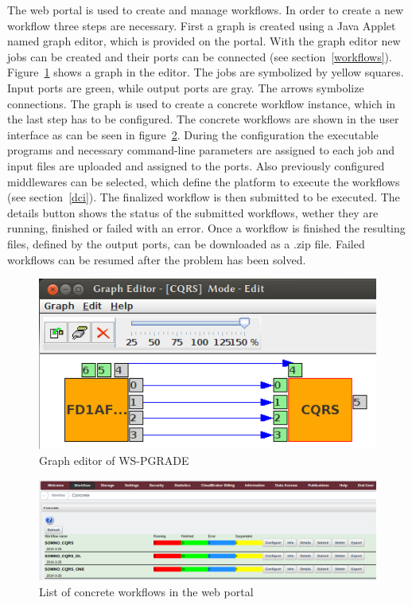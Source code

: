 The web portal is used to create and manage workflows. In order to create a new workflow three steps are necessary. First a graph is created using a Java Applet named graph editor, which is provided on the portal. With the graph editor new jobs can be created and their ports can be connected (see section~\ref{workflows}). Figure~\ref{fig:grapheditor} shows a graph in the editor. The jobs are symbolized by yellow squares. Input ports are green, while output ports are gray. The arrows symbolize connections.
The graph is used to create a concrete workflow instance, which in the last step has to be configured.
The concrete workflows are shown in the user interface as can be seen in figure~\ref{fig:interfaceworkflows}.
During the configuration the executable programs and necessary command-line parameters are assigned to each job and input files are uploaded and assigned to the ports.
Also previously configured middlewares can be selected, which define the platform to execute the workflows (see section~\ref{dci}).
The finalized workflow is then submitted to be executed.
The details button shows the status of the submitted workflows, wether they are running, finished or failed with an error.
Once a workflow is finished the resulting files, defined by the output ports, can be downloaded as a .zip file.
Failed workflows can be resumed after the problem has been solved.

\begin{figure}%
                \centering
                \includegraphics[width=1.0\columnwidth]{images/graph-editor.png}
                \caption{Graph editor of WS-PGRADE}
                \label{fig:grapheditor}
\end{figure}

\begin{figure}%
                \centering
                \includegraphics[width=2.0\columnwidth]{images/interface-workflows.png}
                \caption{List of concrete workflows in the web portal}
                \label{fig:interfaceworkflows}
\end{figure}

